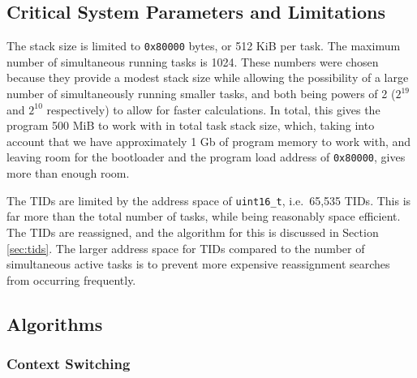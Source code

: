 \documentclass[12pt]{article}
\begin{document}
    \subsection{Critical System Parameters and Limitations}
    \label{sec:limits}
    The stack size is limited to \verb`0x80000` bytes, or 512 KiB per task. The maximum number of simultaneous running tasks is 1024. These numbers were chosen because they provide a modest stack size while allowing the possibility of a large number of simultaneously running smaller tasks, and both being powers of 2 ($2^{19}$ and $2^{10}$ respectively) to allow for faster calculations. In total, this gives the program 500 MiB to work with in total task stack size, which, taking into account that we have approximately 1 Gb of program memory to work with, and leaving room for the bootloader and the program load address of \verb`0x80000`, gives more than enough room.

    The TIDs are limited by the address space of \verb`uint16_t`, i.e.\ 65,535 TIDs. This is far more than the total number of tasks, while being reasonably space efficient. The TIDs are reassigned, and the algorithm for this is discussed in Section \ref{sec:tids}. The larger address space for TIDs compared to the number of simultaneous active tasks is to prevent more expensive reassignment searches from occurring frequently.

    \subsection{Algorithms}

    \subsubsection{Context Switching}
    \label{sec:context-switch}
\end{document}
